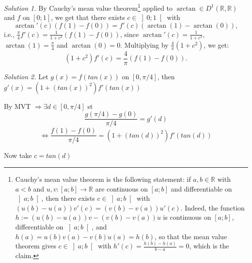 \begin{solution}
    \textit{Solution 1.}
    By Cauchy's mean value theorem\footnote{Cauchy's mean value theorem is the following statement: if \( a, b \in \mathbb{R} \) with \( a < b \) and \( u, v \colon \left[a;b\right] \longrightarrow \mathbb{R} \) are continuous on \( \left[a;b\right] \) and differentiable on \( \left]a;b\right[ \), then there exists \( c \in \left]a;b\right[ \) with \( \left(u\left(b\right)-u\left(a\right)\right)v'\left(c\right) = \left(v\left(b\right)-v\left(a\right)\right)u'\left(c\right) \). Indeed, the function \( h := \left(u\left(b\right)-u\left(a\right)\right)v-\left(v\left(b\right)-v\left(a\right)\right)u \) is continuous on \( \left[a;b\right] \), differentiable on \( \left]a;b\right[ \), and \( h\left(a\right) = u\left(b\right)v\left(a\right)-v\left(b\right)u\left(a\right) = h\left(b\right) \), so that the mean value theorem gives \( c \in \left]a;b\right[ \) with \( h'\left(c\right) = \frac{h\left(b\right)-h\left(a\right)}{b-a} = 0 \), which is the claim.} applied to \( \arctan \in D^1\left(\mathbb{R},\mathbb{R}\right) \) and \( f \) on \( \left[0;1\right] \), we get that there exists \( c \in \left]0;1\right[ \) with
    \[
        \arctan'\left(c\right)\left(f\left(1\right)-f\left(0\right)\right) = f'\left(c\right)\left(\arctan\left(1\right)-\arctan\left(0\right)\right),
    \]
    i.e., \( \frac{\pi}{4} f'\left(c\right) = \frac{1}{1+c^2}\left(f\left(1\right)-f\left(0\right)\right) \), since \( \arctan'\left(c\right) = \frac{1}{1+c^2} \), \( \arctan\left(1\right) = \frac{\pi}{4} \) and \( \arctan\left(0\right) = 0 \). Multiplying by \( \frac{4}{\pi}\left(1+c^2\right) \), we get:
    \[
        \left(1+c^2\right)f'\left(c\right) = \frac{4}{\pi}\left(f\left(1\right)-f\left(0\right)\right).
    \]

    \textit{Solution 2.}
    Let \( g(x)= f(tan(x)) \) on \( [0, \pi/4] \), then \( g'(x)= (1+(tan(x))^2) f'(tan(x)) \)

    By MVT \( \Rightarrow \exists d \in [0, \pi/4] \) st
    \[
        \frac{g(\pi/4)-g(0)}{\pi/4}= g'(d)
    \]
    \[
        \iff \frac{f(1)-f(0)}{\pi /4}= (1+ (tan(d))^2)f'(tan(d))
    \]

    Now take \( c=tan(d) \)

\end{solution}

